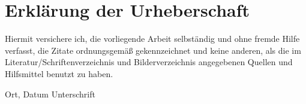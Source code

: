 \section{Erkl{\"a}rung der Urheberschaft}

Hiermit versichere ich, die vorliegende Arbeit selbst{\"a}ndig und ohne fremde Hilfe verfasst,
die Zitate ordnungsgem{\"a}{\ss} gekennzeichnet und keine anderen,
als die im Literatur/Schriftenverzeichnis und Bilderverzeichnis angegebenen Quellen und Hilfsmittel
benutzt zu haben.

\vspace{4cm}

\hspace{2cm} Ort, Datum \hfill Unterschrift \hspace{2cm}




